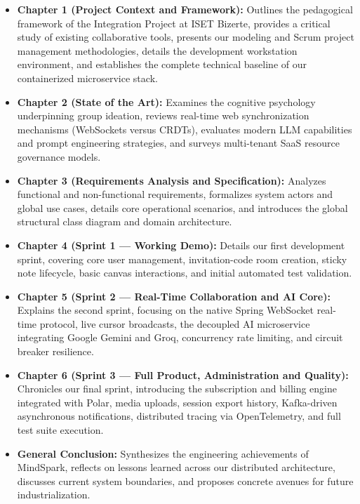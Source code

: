 \begin{itemize}[leftmargin=1.5em]
    \item \textbf{Chapter 1 (Project Context and Framework):} Outlines the pedagogical framework of the Integration Project at ISET Bizerte, provides a critical study of existing collaborative tools, presents our modeling and Scrum project management methodologies, details the development workstation environment, and establishes the complete technical baseline of our containerized microservice stack.
    \item \textbf{Chapter 2 (State of the Art):} Examines the cognitive psychology underpinning group ideation, reviews real-time web synchronization mechanisms (WebSockets versus CRDTs), evaluates modern LLM capabilities and prompt engineering strategies, and surveys multi-tenant SaaS resource governance models.
    \item \textbf{Chapter 3 (Requirements Analysis and Specification):} Analyzes functional and non-functional requirements, formalizes system actors and global use cases, details core operational scenarios, and introduces the global structural class diagram and domain architecture.
    \item \textbf{Chapter 4 (Sprint 1 --- Working Demo):} Details our first development sprint, covering core user management, invitation-code room creation, sticky note lifecycle, basic canvas interactions, and initial automated test validation.
    \item \textbf{Chapter 5 (Sprint 2 --- Real-Time Collaboration and AI Core):} Explains the second sprint, focusing on the native Spring WebSocket real-time protocol, live cursor broadcasts, the decoupled AI microservice integrating Google Gemini and Groq, concurrency rate limiting, and circuit breaker resilience.
    \item \textbf{Chapter 6 (Sprint 3 --- Full Product, Administration and Quality):} Chronicles our final sprint, introducing the subscription and billing engine integrated with Polar, media uploads, session export history, Kafka-driven asynchronous notifications, distributed tracing via OpenTelemetry, and full test suite execution.
    \item \textbf{General Conclusion:} Synthesizes the engineering achievements of MindSpark, reflects on lessons learned across our distributed architecture, discusses current system boundaries, and proposes concrete avenues for future industrialization.
\end{itemize}

